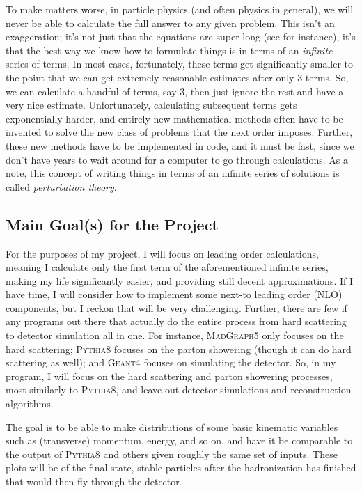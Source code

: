 To make matters worse, in particle physics (and often physics in general), we will never be able to calculate the full answer to any given problem. This isn't an exaggeration; it's not just that the equations are super long (see \cite{MATHEWS2005333} for instance), it's that the best way we know how to formulate things is in terms of an \textit{infinite} series of terms. In most cases, fortunately, these terms get significantly smaller to the point that we can get extremely reasonable estimates after only 3 terms. So, we can calculate a handful of terms, say 3, then just ignore the rest and have a very nice estimate. Unfortunately, calculating subsequent terms gets exponentially harder, and entirely new mathematical methods often have to be invented to solve the new class of problems that the next order imposes. Further, these new methods have to be implemented in code, and it must be fast, since we don't have years to wait around for a computer to go through calculations. As a note, this concept of writing things in terms of an infinite series of solutions is called \textit{perturbation theory}.

\subsection{Main Goal(s) for the Project}

For the purposes of my project, I will focus on leading order calculations, meaning I calculate only the first term of the aforementioned infinite series, making my life significantly easier, and providing still decent approximations. If I have time, I will consider how to implement some next-to leading order (NLO) components, but I reckon that will be very challenging. Further, there are few if any programs out there that actually do the entire process from hard scattering to detector simulation all in one. For instance, \textsc{MadGraph5} only focuses on the hard scattering; \textsc{Pythia8} focuses on the parton showering (though it can do hard scattering as well); and \textsc{Geant4} focuses on simulating the detector. So, in my program, I will focus on the hard scattering and parton showering processes, most similarly to \textsc{Pythia8}, and leave out detector simulations and reconstruction algorithms.

The goal is to be able to make distributions of some basic kinematic variables such as (transverse) momentum, energy, and so on, and have it be comparable to the output of \textsc{Pythia8} and others given roughly the same set of inputs. These plots will be of the final-state, stable particles after the hadronization has finished that would then fly through the detector. 

